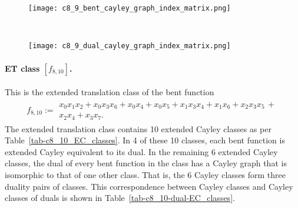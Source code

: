 \documentclass[12pt,a4paper]{article}
\begin{document}
\begin{figure}[!bhpt] %
\centering
\begin{minipage}{.48\textwidth}
  \centering
  \texttt{[image: c8\_9\_bent\_cayley\_graph\_index\_matrix.png]}
  \label{fig:c8_9_bent_cayley_graph_index_matrix}
\end{minipage}
~~
\begin{minipage}{.48\textwidth}
  \centering
  \texttt{[image: c8\_9\_dual\_cayley\_graph\_index\_matrix.png]}
  \label{fig:c8_9_dual_cayley_graph_index_matrix}
\end{minipage}%
\end{figure}
\paragraph*{ET class $[f_{8,10}]$.}
%
This is the extended translation class of the bent function
\small{}
\begin{align*}
f_{ 8 , 10 } :=
\begin{array}{l}
x_{0} x_{1} x_{2} + x_{0} x_{3} x_{6} + x_{0} x_{4} + x_{0} x_{5} + x_{1} x_{3} x_{4} + x_{1} x_{6}
+ x_{2} x_{3} x_{5}\, +
\\
x_{2} x_{4} + x_{3} x_{7}.
\end{array}
\end{align*}
\normalsize{}
The extended translation class contains 10 extended Cayley classes as per Table~\ref{tab-c8_10_EC_classes}.
In 4 of these 10 classes, each bent function is extended Cayley equivalent to its dual.
In the remaining 6 extended Cayley classes, the dual of every bent function in the class has a Cayley graph
that is isomorphic to that of one other class. That is, the 6 Cayley classes form three duality pairs of classes.
This correspondence between Cayley classes and Cayley classes of duals is shown in Table~\ref{tab-c8_10-dual-EC_classes}.
\end{document}
